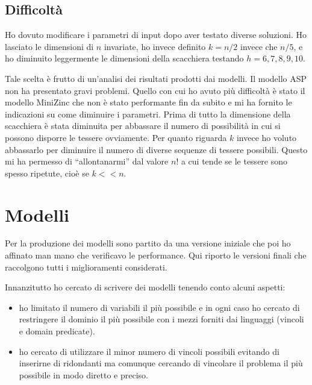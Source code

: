 \documentclass[12pt,a4paper,english,italian]{article}
\begin{document}
\subsection{Difficoltà}
Ho dovuto modificare i parametri di input dopo aver testato diverse soluzioni. Ho lasciato le dimensioni di $n$ invariate, ho invece definito $k = n/2$ invece che $n/5$, e ho diminuito leggermente le dimensioni della scacchiera testando $h = 6,7,8,9,10$.

Tale scelta è frutto di un'analisi dei risultati prodotti dai modelli. Il modello ASP non ha presentato gravi problemi. Quello con cui ho avuto più difficoltà è stato il modello MiniZinc che non è stato performante fin da subito e mi ha fornito le indicazioni su come diminuire i parametri. Prima di tutto la dimensione della scacchiera è stata diminuita per abbassare il numero di possibilità in cui si possono disporre le tessere ovviamente. Per quanto riguarda $k$ invece ho voluto abbassarlo per diminuire il numero di diverse sequenze di tessere possibili. Questo mi ha permesso di ``allontanarmi'' dal valore $n!$ a cui tende se le tessere sono spesso ripetute, cioè se $k << n$.


\section{Modelli}
Per la produzione dei modelli sono partito da una versione iniziale che poi ho affinato man mano che verificavo le performance. Qui riporto le versioni finali che raccolgono tutti i miglioramenti considerati.

Innanzitutto ho cercato di scrivere dei modelli tenendo conto alcuni aspetti:
\begin{itemize}
	\item ho limitato il numero di variabili il più possibile e in ogni caso ho cercato di restringere il dominio il più possibile con i mezzi forniti dai linguaggi (vincoli e domain predicate).
	\item ho cercato di utilizzare il minor numero di vincoli possibili evitando di inserirne di ridondanti ma comunque cercando di vincolare il problema il più possibile in modo diretto e preciso.
\end{itemize}
\end{document}
